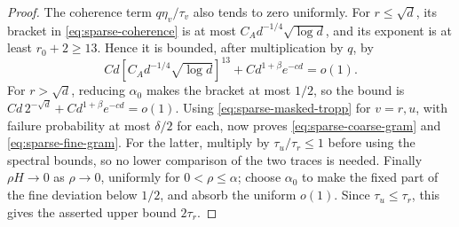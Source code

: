 \begin{proof}
The coherence term $q\eta_v/\tau_v$ also tends to zero uniformly.
For $r\le\sqrt d$, its bracket in \eqref{eq:sparse-coherence} is at
most $C_A d^{-1/4}\sqrt{\log d}$, and its exponent is at least
$r_0+2\ge13$. Hence it is bounded, after multiplication by $q$, by
\[
 C d[C_A d^{-1/4}\sqrt{\log d}]^{13}
       +C d^{1+\beta}e^{-cd}=o(1).
\]
For $r>\sqrt d$, reducing $\alpha_0$ makes the bracket at most $1/2$,
so the bound is $Cd\,2^{-\sqrt d}+Cd^{1+\beta}e^{-cd}=o(1)$.
Using \eqref{eq:sparse-masked-tropp} for $v=r,u$, with failure
probability at most $\delta/2$ for each, now proves
\eqref{eq:sparse-coarse-gram} and \eqref{eq:sparse-fine-gram}.
For the latter, multiply by $\tau_u/\tau_r\le1$ before using the
spectral bounds, so no lower comparison of the two traces is needed.
Finally $\rho H\to0$ as $\rho\to0$, uniformly for $0<\rho\le\alpha$;
choose $\alpha_0$ to make the fixed part of the fine deviation below
$1/2$, and absorb the uniform $o(1)$. Since $\tau_u\le\tau_r$, this
gives the asserted upper bound $2\tau_r$.
\end{proof}

